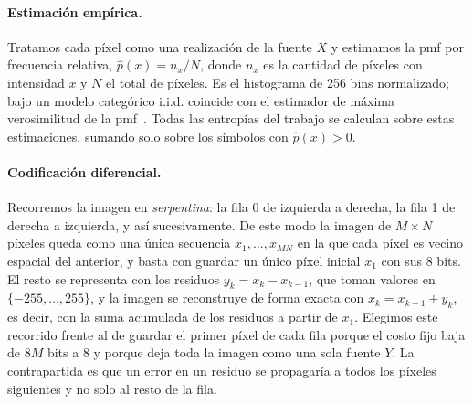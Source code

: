 \documentclass[11pt,a4paper]{article}
\begin{document}
\paragraph{Estimación empírica.}
Tratamos cada píxel como una realización de la fuente $X$ y estimamos la pmf por frecuencia
relativa, $\hat p(x) = n_x / N$, donde $n_x$ es la cantidad de píxeles con intensidad $x$ y $N$ el
total de píxeles. Es el histograma de 256 bins normalizado; bajo un modelo categórico i.i.d. coincide
con el estimador de máxima verosimilitud de la pmf~\cite{teoricas}. Todas las entropías del trabajo se calculan sobre estas estimaciones, sumando
solo sobre los símbolos con $\hat p(x) > 0$.

\paragraph{Codificación diferencial.}
Recorremos la imagen en \emph{serpentina}: la fila 0 de izquierda a derecha, la fila 1 de derecha a
izquierda, y así sucesivamente. De este modo la imagen de $M \times N$ píxeles queda como una única
secuencia $x_1, \dots, x_{MN}$ en la que cada píxel es vecino espacial del anterior, y basta con
guardar un único píxel inicial $x_1$ con sus 8 bits. El resto se representa con los residuos
$y_k = x_k - x_{k-1}$, que toman valores en $\{-255, \dots, 255\}$, y la imagen se reconstruye de
forma exacta con $x_k = x_{k-1} + y_k$, es decir, con la suma acumulada de los residuos a partir de
$x_1$. Elegimos este recorrido frente al de guardar el primer píxel de cada fila porque el costo fijo
baja de $8M$ bits a 8 y porque deja toda la imagen como una sola fuente $Y$. La contrapartida es que un
error en un residuo se propagaría a todos los píxeles siguientes y no solo al resto de la fila.
\end{document}
